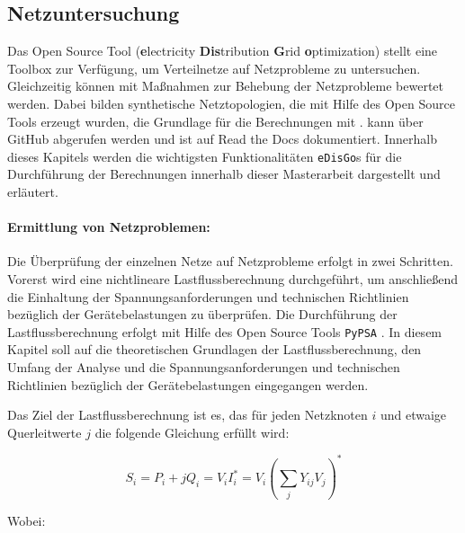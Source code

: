 \subsection{Netzuntersuchung}\label{chap:edisgo_theo}

Das Open Source Tool \edisgo (\textbf{e}lectricity \textbf{Dis}tribution \textbf{G}rid \textbf{o}ptimization) stellt eine Toolbox zur Verfügung, um Verteilnetze auf Netzprobleme zu untersuchen.
Gleichzeitig können mit \edisgo Maßnahmen zur Behebung der Netzprobleme bewertet werden.
Dabei bilden synthetische Netztopologien, die mit Hilfe des Open Source Tools \dingo erzeugt wurden, die Grundlage für die Berechnungen mit \edisgodot.
\edisgo kann über GitHub \cite{edisgoGit2019} abgerufen werden und ist auf Read the Docs \cite{edisgoDocs2017} dokumentiert.
Innerhalb dieses Kapitels werden die wichtigsten Funktionalitäten \texttt{eDisGo}s für die Durchführung der Berechnungen innerhalb dieser Masterarbeit dargestellt und erläutert.


\paragraph{Ermittlung von Netzproblemen:}\label{chap:grid_issues}

Die Überprüfung der einzelnen Netze auf Netzprobleme erfolgt in zwei Schritten.
Vorerst wird eine nichtlineare Lastflussberechnung durchgeführt, um anschließend die Einhaltung der Spannungsanforderungen und technischen Richtlinien bezüglich der Gerätebelastungen zu überprüfen.
Die Durchführung der Lastflussberechnung erfolgt mit Hilfe des Open Source Tools \texttt{PyPSA} \cite{Brown2020}.
In diesem Kapitel soll auf die theoretischen Grundlagen der Lastflussberechnung, den Umfang der Analyse und die Spannungsanforderungen und technischen Richtlinien bezüglich der Gerätebelastungen eingegangen werden.\medskip

Das Ziel der Lastflussberechnung ist es, das für jeden Netzknoten $i$ und etwaige Querleitwerte $j$ die folgende Gleichung erfüllt wird:

\begin{equation}
	S_i = P_i + j Q_i = V_i I_i^* = V_i \left(\sum_j Y_{ij} V_j \right)^*
	\label{eq:pf}
\end{equation}

\noindent Wobei:


